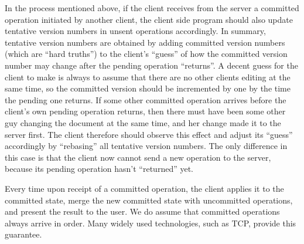 In the process mentioned above, if the client receives from the server a
committed operation initiated by another client, the client side program should
also update tentative version numbers in unsent operations accordingly. In
summary, tentative version numbers are obtained by adding committed version
numbers (which are ``hard truths'') to the client's ``guess'' of how the
committed version number may change after the pending operation ``returns''. A
decent guess for the client to make is always to assume that there are no other
clients editing at the same time, so the committed version should be incremented
by one by the time the pending one returns. If some other committed operation
arrives before the client's own pending operation returns, then there must have
been some other guy changing the document at the same time, and her change made
it to the server first. The client therefore should observe this effect and
adjust its ``guess'' accordingly by ``rebasing'' all tentative version numbers.
The only difference in this case is that the client now cannot send a new
operation to the server, because its pending operation hasn't ``returned'' yet.

Every time upon receipt of a committed operation, the client applies it to the
committed state, merge the new committed state with uncommitted operations, and
present the result to the user. We do assume that committed operations always
arrive in order. Many widely used technologies, such as TCP, provide this
guarantee.
